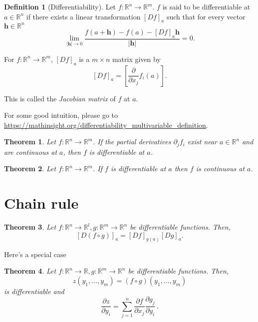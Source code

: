 \documentclass[
]{book}
\newtheorem{theorem}{Theorem}[chapter]
\theoremstyle{definition}
\newtheorem{definition}{Definition}[chapter]
\theoremstyle{definition}
\theoremstyle{definition}
\theoremstyle{definition}
\theoremstyle{remark}
\begin{document}
\begin{definition}[Differentiability]
Let \(f:\mathbb{R}^n \to \mathbb{R}^m\).
\(f\) is said to be differentiable at \(a \in \mathbb{R}^n\) if
there exists a linear transformation \([Df]_a\) such that for every vector \(\mathbf{h} \in \mathbb{R}^n\)
\[\lim_{|\mathbf{h}| \to 0} \frac{ f(a + \mathbf{h}) - f(a) - [Df]_a \mathbf{h}}{| \mathbf{h} |} = 0 . \]
\end{definition}

For \(f:\mathbb{R}^n \to \mathbb{R}^m\), \([Df]_a\) is a \(m\times n\) matrix given by
\[[Df]_a = \left[ \frac{\partial }{\partial x_j} f_i (a)\right].\]

This is called the \emph{Jacobian matrix} of \(f\) at \(a\).

For some good intuition, please go to \url{https://mathinsight.org/differentiability_multivariable_definition}.

\begin{theorem}
Let \(f:\mathbb{R}^n \to \mathbb{R}^m\).
If the partial derivatives \(\partial_j f_i\) exist near \(a\in \mathbb{R}^n\) and are continuous
at \(a\), then \(f\) is differentiable at \(a\).
\end{theorem}

\begin{theorem}
Let \(f:\mathbb{R}^n \to \mathbb{R}^m\).
If \(f\) is differentiable at \(a\) then \(f\) is continuous at \(a\).
\end{theorem}

\hypertarget{chain-rule}{%
\section{Chain rule}\label{chain-rule}}

\begin{theorem}
Let \(f: \mathbb{R}^n \to \mathbb{R}^l, g: \mathbb{R}^m \to \mathbb{R}^n\) be
differentiable functions.
Then,
\[ [D (f\circ g)]_a = [Df]_{g(a)} [Dg]_a. \]
\end{theorem}

Here's a special case

\begin{theorem}
Let \(f: \mathbb{R}^n \to \mathbb{R}, g: \mathbb{R}^m \to \mathbb{R}^n\) be
differentiable functions.
Then,
\[z(y_1, \dots, y_m) = (f\circ g)(y_1, \dots, y_m)\]
is differentiable and
\begin{equation*}
    \frac{\partial z}{\partial y_i} = \sum_{j=1}^n \frac{\partial f}{\partial x_j} \frac{\partial g_j}{\partial y_i} \,.
\end{equation*}
\end{theorem}
\end{document}
